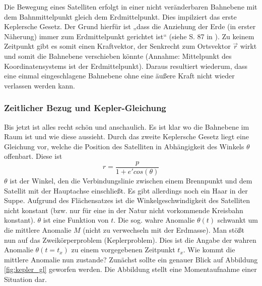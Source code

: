 \newpar
Die Bewegung eines Satelliten erfolgt in einer nicht veränderbaren Bahnebene mit dem Bahnmittelpunkt gleich dem Erdmittelpunkt. Dies impilziert das erste Keplersche Gesetz. Der Grund hierfür ist „dass die Anziehung der Erde (in erster Näherung) immer zum Erdmittelpunkt gerichtet ist“ (siehe S. 87 in \cite{HandRaum}). Zu keinem Zeitpunkt gibt es somit einen Kraftvektor, der Senkrecht zum Ortsvektor \ensuremath{\vec{r}} wirkt und somit die Bahnebene verschieben könnte (Annahme: Mittelpunkt des Koordinatensystems ist der Erdmittelpunkt). Daraus resultiert wiederum, dass eine einmal eingeschlagene Bahnebene ohne eine äußere Kraft nicht wieder verlassen werden kann.
 
\subsubsection{Zeitlicher Bezug und Kepler-Gleichung}
Bis jetzt ist alles recht schön und anschaulich. Es ist klar wo die Bahnebene im Raum ist und wie diese aussieht. Durch das zweite Keplersche Gesetz liegt eine Gleichung vor, welche die Position des Satelliten in Abhängigkeit des Winkels \ensuremath{\theta} offenbart. Diese ist 
\begin{equation}
	r = \frac{p}{1 + e' cos(\theta)} 
\end{equation}
\ensuremath{\theta} ist der Winkel, den die Verbindungslinie zwischen einem Brennpunkt und dem Satellit mit der Hauptachse einschließt. Es gibt allerdings noch ein Haar in der Suppe. Aufgrund des Flächensatzes ist die Winkelgeschwindigkeit des Satelliten nicht konstant (bzw. nur für eine in der Natur nicht vorkommende Kreisbahn konstant). \ensuremath{\theta} ist eine Funktion von \ensuremath{t}. Die sog. wahre Anomalie \ensuremath{\theta(t)} schwankt um die mittlere Anomalie \ensuremath{M} (nicht zu verwechseln mit der Erdmasse). Man stößt nun auf das Zweikörperproblem (Keplerproblem). Dies ist die Angabe der wahren Anomalie \ensuremath{\theta(t=t_x)} zu einem vorgegebenen Zeitpunkt \ensuremath{t_x}.  Wie kommt die mittlere Anomalie nun zustande? Zunächst sollte ein genauer Blick auf Abbildung \ref{fig:kepler_gl} geworfen werden. Die Abbildung stellt eine Momentaufnahme einer Situation dar.     
